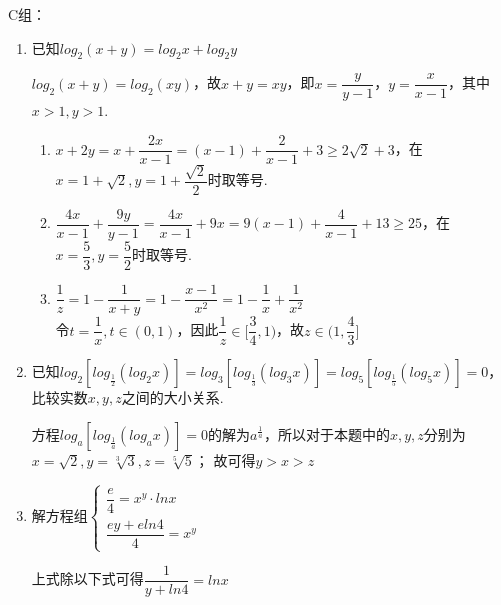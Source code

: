 C组：
\begin{enumerate}
    \item 已知$log_2(x+y) = log_2x+log_2y$ \\
    \begin{jieda}
        $log_2(x+y) = log_2(xy)$，故$x+y = xy$，即$x = \dfrac{y}{y-1}$，$y = \dfrac{x}{x-1}$，其中$x > 1, y > 1$.
        \begin{enumerate}[(1)]
            \item $x + 2y = x + \dfrac{2x}{x-1} = (x-1) + \dfrac{2}{x-1}+3 \geq 2\sqrt{2} + 3$，在$x = 1+\sqrt{2}, y = 1 + \dfrac{\sqrt{2}}{2}$时取等号.
            \item $\dfrac{4x}{x-1} + \dfrac{9y}{y-1} = \dfrac{4x}{x-1} + 9x = 9(x-1) + \dfrac{4}{x-1}+13 \geq 25$，在$x = \dfrac{5}{3}, y = \dfrac{5}{2}$时取等号.
            \item $\dfrac{1}{z} = 1 - \dfrac{1}{x+y} = 1 - \dfrac{x-1}{x^2} = 1 - \dfrac{1}{x} + \dfrac{1}{x^2}$\\
            令$t = \dfrac{1}{x}, t \in (0, 1)$，因此$\dfrac{1}{z} \in [\dfrac{3}{4}, 1)$，故$z \in (1, \dfrac{4}{3}]$
        \end{enumerate}
    \end{jieda}
    \item 已知$log_2[log_{\frac{1}{2}}(log_2x)] = log_3[log_{\frac{1}{3}}(log_3x)] = log_5[log_{\frac{1}{5}}(log_5x)] = 0$，比较实数$x, y, z$之间的大小关系.
    \begin{jieda}
        方程$log_a[log_{\frac{1}{a}}(log_ax)] = 0$的解为$a^{\frac{1}{a}}$，所以对于本题中的$x, y, z$分别为$x = \sqrt{2}, y = \sqrt[3]{3}, z = \sqrt[5]{5}$；
        故可得$y > x > z$
    \end{jieda}
    \item 解方程组$\left \{ \begin{array}{l}
         \dfrac{e}{4} = x^y \cdot lnx\\
         \dfrac{ey+eln4}{4} = x^y 
    \end{array}\right.$ \\
    \begin{jieda}
        上式除以下式可得$\dfrac{1}{y+ln4} = lnx$ \\

\end{jieda}
\end{enumerate}
